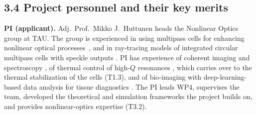 \documentclass[a4paper,12pt]{article}
\newcommand{\tbd}[1]{\textcolor{red}{[TBD: #1]}}
\newcommand{\nc}[1]{\textcolor{dkleaf}{#1}} %
\begin{document}
\subsection*{3.4 Project personnel and their key merits}


\textbf{PI (applicant).} Adj.\ Prof.\ Mikko J.\ Huttunen heads the Nonlinear Optics group at TAU. The group is experienced in using multipass cells for enhancing nonlinear optical processes~\cite{Mekhael2024}, and in ray-tracing models of integrated circular multipass cells with speckle outputs \cite{Arola2026}. PI has experience of coherent imaging and spectroscopy \cite{Huttunen2017, Kopf2021}, of thermal control of high-$Q$ resonances \cite{Kelavuori2022}, which carries over to \nc{the thermal stabilization of the cells (T1.3),} and of bio-imaging with deep-learning-based data analysis for tissue diagnostics \cite{Huttunen2020, Anton2023}. The PI leads WP4, supervises the team, developed the theoretical and simulation frameworks the project builds on, and provides nonlinear-optics expertise (T3.2).
\end{document}
